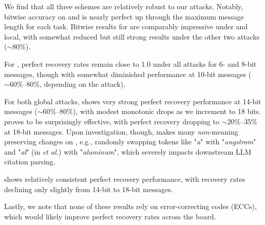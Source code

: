 We find that all three schemes are relatively robust to our attacks. Notably, bitwise accuracy on \sg and \qa is nearly perfect up through the maximum message length for each task. Bitwise results for \lr are comparably impressive under \rtt and \llmp local, with somewhat reduced but still strong results under the other two attacks (${\sim}80\%$).

For \qa, perfect recovery rates remain close to 1.0 under all attacks for 6- and 8-bit messages, though with somewhat diminished performance at 10-bit messages (${\sim}60\%$--$80\%$, depending on the attack).

For both global attacks, \lr shows very strong perfect recovery performance at 14-bit messages (${\sim}60\%$--$80\%$), with modest monotonic drops as we increment to 18 bits. \syn
proves to be surprisingly effective, with perfect recovery dropping to ${\sim}20\%$--$35\%$ at 18-bit messages. Upon investigation, though, \syn makes many \emph{non-}meaning preserving changes on \lr, e.g., randomly swapping tokens like "\textit{a}" with "\textit{angstrom}" and "\textit{al}" (in \emph{et al.}) with "\textit{aluminum}", which severely impacts downstream LLM citation parsing.

\sg shows relatively consistent perfect recovery performance, with recovery rates declining only slightly from 14-bit to 18-bit messages.

Lastly, we note that none of these results rely on error-correcting codes (ECCs), which would likely improve perfect recovery rates across the board.

